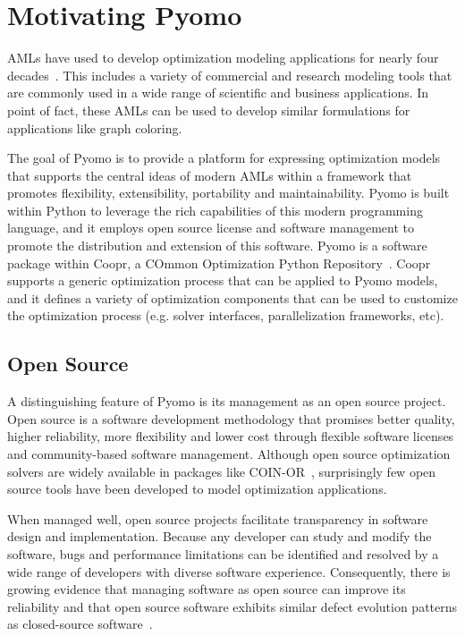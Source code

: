 \section{Motivating Pyomo}
\label{sec:intro:pyomo}

AMLs have used to develop optimization modeling applications for
nearly four decades~\cite{Kal04}.  This includes a variety of commercial
and research modeling tools that are commonly used in a wide range of
scientific and business applications.  In point of fact, these AMLs can be
used to develop similar formulations for applications like graph coloring.

The goal of Pyomo is to provide a platform for expressing 
optimization models that supports the central ideas of modern AMLs
within a framework that promotes flexibility, extensibility, portability
and maintainability.  Pyomo is built within Python to leverage the rich
capabilities of this modern programming language, and it employs open
source license and software management to promote the distribution and
extension of this software.  Pyomo is a software package within Coopr,
a COmmon Optimization Python Repository~\citep{Coopr}.  Coopr supports
a generic optimization process that can be applied to Pyomo models,
and it defines a variety of optimization components that can be
used to customize the optimization process (e.g. solver interfaces,
parallelization frameworks, etc).


\subsection{Open Source}

A distinguishing feature of Pyomo is its management as an open source
project. Open source is a software development methodology that promises
better quality, higher reliability, more flexibility and lower cost
through flexible software licenses and community-based software management.
Although open source optimization solvers are widely available in packages
like COIN-OR~\citep{COINOR}, surprisingly few open source tools have
been developed to model optimization applications.

When managed well, open source projects facilitate transparency in
software design and implementation. Because any developer can study
and modify the software, bugs and performance limitations can be
identified and resolved by a wide range of developers with diverse
software experience.  Consequently, there is growing evidence that
managing software as open source can improve its reliability and that
open source software exhibits similar defect evolution patterns as
closed-source software~\citep{fedora-oss,oss-reliabilitymodel}.

